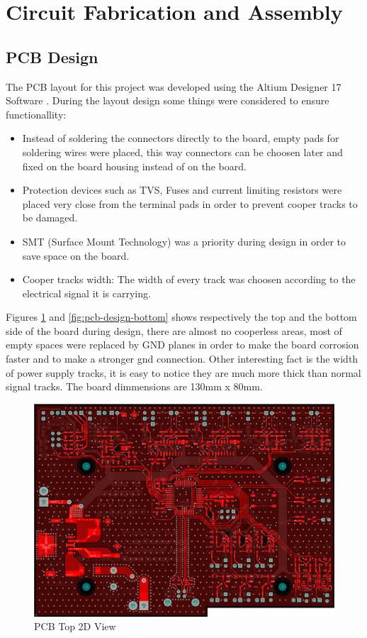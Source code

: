 \section{Circuit Fabrication and Assembly}\label{sec:printed-circuit-board}

	\subsection{PCB Design}\label{ssec:pcb-design}

		The PCB layout for this project was developed using the Altium Designer 17 Software \cite{AD17}. During the layout design some things were considered to ensure functionallity:

		\begin{itemize}
			\item Instead of soldering the connectors directly to the board, empty pads for soldering wires were placed, this way connectors can be choosen later and fixed on the board housing instead of on the board.\label{itm:pcb-pin-bars}
			\item Protection devices such as TVS, Fuses and current limiting resistors were placed very close from the terminal pads in order to prevent cooper tracks to be damaged.\label{itm:pcb-protection}
			\item SMT (Surface Mount Technology) was a priority during design in order to save space on the board.\label{itm:pcb-smt}
			\item Cooper tracks width: The width of every track was choosen according to the electrical signal it is carrying.\label{itm:pcb-track}
 		\end{itemize}

 		Figures \ref{fig:pcb-design-top} and \ref{fig:pcb-design-bottom} shows respectively the top and the bottom side of the board during design, there are almost no cooperless areas, most of empty spaces were replaced by GND planes in order to make the board corrosion faster and to make a stronger gnd connection. Other interesting fact is the width of power supply tracks, it is easy to notice they are much more thick than normal signal tracks. The board dimmensions are 130mm x 80mm.

		\begin{figure}[htbp]
			\centering
			\includegraphics[width=.8\textwidth]{figuras/fig-pcb-design-top}
			\caption{PCB Top 2D View}
			\label{fig:pcb-design-top}
		\end{figure}

